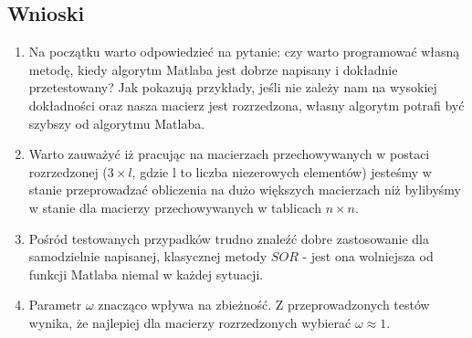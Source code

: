 \documentclass{article}
\begin{document}
\subsection{Wnioski}
\begin{enumerate}
\item Na początku warto odpowiedzieć na pytanie: czy warto programować własną metodę, kiedy algorytm Matlaba jest dobrze napisany i dokładnie przetestowany? Jak pokazują przykłady, jeśli nie zależy nam na wysokiej dokładności oraz nasza macierz jest rozrzedzona, własny algorytm potrafi być szybszy od algorytmu Matlaba.
\item Warto zauważyć iż pracując na macierzach przechowywanych w postaci rozrzedzonej ($3\times l$, gdzie l to liczba niezerowych elementów) jesteśmy w stanie przeprowadzać obliczenia na dużo większych macierzach niż bylibyśmy w stanie dla macierzy przechowywanych w tablicach $n \times n$.
\item Pośród testowanych przypadków trudno znaleźć dobre zastosowanie dla samodzielnie napisanej, klasycznej metody $SOR$ - jest ona wolniejsza od funkcji Matlaba niemal w każdej sytuacji.
\item Parametr $\omega$ znacząco wpływa na zbieżność. Z przeprowadzonych testów wynika, że najlepiej dla macierzy rozrzedzonych wybierać $\omega \approx 1$.
\end{enumerate}
\end{document}
